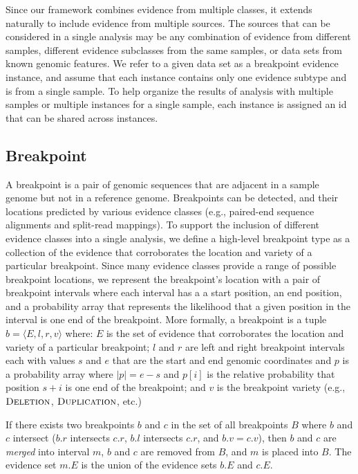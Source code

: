 \documentclass[10pt]{bmc_article}
\newenvironment{bmcformat}{\begin{raggedright}\baselineskip20pt\sloppy\setboolean{publ}{false}}{\end{raggedright}\baselineskip20pt\sloppy}
\begin{document}
\begin{bmcformat}
Since our framework combines evidence from multiple classes, it extends
naturally to include evidence from multiple sources.  The sources that can be
considered in a single analysis may be any combination of evidence from
different samples, different evidence subclasses from the same samples, or
data sets from known genomic features.  We refer to a given data set as a
breakpoint evidence instance, and assume that each instance contains only one
evidence subtype and is from a single sample.  To help organize the results of
analysis with multiple samples or multiple instances for a single sample,
each instance is assigned an id that can be shared across instances.


\subsection*{Breakpoint}

A breakpoint is a pair of genomic sequences that are adjacent in a sample genome
but not in a reference genome. Breakpoints can be detected, and their locations
predicted by various evidence classes (e.g., paired-end sequence alignments and
split-read mappings).  To support the inclusion of different evidence classes
into a single analysis, we define a high-level breakpoint type as a collection
of the evidence that corroborates the location and variety of a particular
breakpoint.  Since many evidence classes provide a range of possible breakpoint
locations, we represent the breakpoint's location with a pair of breakpoint
intervals where each interval has a a start position, an end position, and a
probability array that represents the likelihood that a given position in the
interval is one end of the breakpoint.  More formally, a breakpoint is a tuple
$b=\langle E,l,r,v \rangle$ where: $E$ is the set of evidence that corroborates
the location and variety of a particular breakpoint; $l$ and $r$ are left and
right breakpoint intervals each with values $s$ and $e$ that are the start and
end genomic coordinates and $p$ is a probability array where $|p|=e-s$ and
$p[i]$ is the relative probability that position $s+i$ is one end of the
breakpoint; and $v$ is the breakpoint variety (e.g., $\textsc{Deletion}$,
$\textsc{Duplication}$, etc.)

If there exists two breakpoints $b$ and $c$ in the set of all breakpoints $B$
where $b$ and $c$  intersect ($b.r$ intersects $c.r$, $b.l$ intersects $c.r$,
and $b.v = c.v$), then $b$ and $c$ are {\em merged} into interval $m$, $b$ and
$c$ are removed from $B$, and $m$ is placed into $B$.  The evidence set $m.E$ is
the union of the evidence sets $b.E$ and $c.E$.  


\end{bmcformat}
\end{document}
